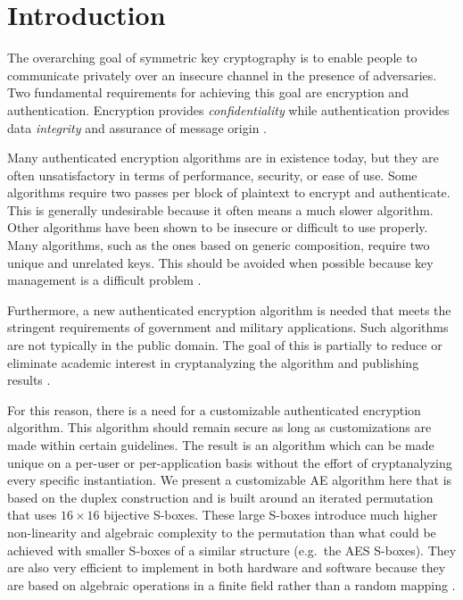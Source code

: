 \section{Introduction}
The overarching goal of symmetric key cryptography is to enable people to communicate privately over an insecure channel in the presence of adversaries.
Two fundamental requirements for achieving this goal are encryption and authentication.
Encryption provides \emph{confidentiality} while authentication provides data \emph{integrity} and assurance of message origin \cite{Stinson2006_CTAP}.

Many authenticated encryption algorithms are in existence today, but they are often unsatisfactory in terms of performance, security, or ease of use.
Some algorithms require two passes per block of plaintext to encrypt and authenticate.
This is generally undesirable because it often means a much slower algorithm.
Other algorithms have been shown to be insecure or difficult to use properly.
Many algorithms, such as the ones based on generic composition, require two unique and unrelated keys.
This should be avoided when possible because key management is a difficult problem \cite{Ferguson2010_CryptographyEngineering}.

Furthermore, a new authenticated encryption algorithm is needed that meets the stringent requirements of government and military applications.
Such algorithms are not typically in the public domain.
The goal of this is partially to reduce or eliminate academic interest in cryptanalyzing the algorithm and publishing results \cite{Kurdziel2002_BaselineRequirements}.

For this reason, there is a need for a customizable authenticated encryption algorithm.
This algorithm should remain secure as long as customizations are made within certain guidelines.
The result is an algorithm which can be made unique on a per-user or per-application basis without the effort of cryptanalyzing every specific instantiation.
We present a customizable AE algorithm here that is based on the duplex construction and is built around an iterated permutation that uses $16 \times 16$ bijective S-boxes. 
These large S-boxes introduce much higher non-linearity and algebraic complexity to the permutation than what could be achieved with smaller S-boxes of a similar structure (e.g.\ the AES S-boxes).
They are also very efficient to implement in both hardware and software because they are based on algebraic operations in a finite field rather than a random mapping \cite{Wood2013_SboxThesis}.

